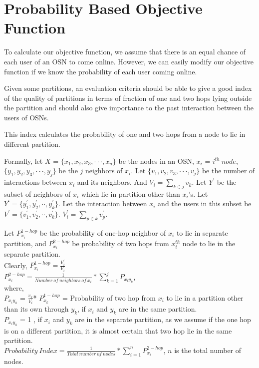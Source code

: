 \documentclass[letterpaper]{article}
\begin{document}
\section{Probability Based Objective Function}

   To calculate our objective function, we assume that there is an equal chance of each user of an 
OSN to come online. However, we can easily modify our objective function if we know the probability of each user
coming online.

 Given some partitions, an evaluation criteria should be able to give a good index of 
the quality of partitions in terms of fraction of one and two hops lying
outside the partition and should also give importance to the past interaction between the users of OSNs. 
  
This index calculates the probability of one and two hops from a node to lie in different partition. 

Formally, let $X$ = $\{x_1,x_2,x_3,\cdot\cdot\cdot,x_n\}$ be the nodes in an OSN, $x_i$ = $i^{th}\ node$, 
$\{y_1, y_2, y_3,\cdot\cdot\cdot,y_j\}$ be the $j$ neighbors of $x_i$. Let $\{v_1, v_2, v_3, \cdot\cdot\cdot,
 v_j\}$ be the number of interactions between $x_i$ and its neighbors. And $V_i = \sum_{k\in j} v_k$.
 Let $Y^\prime$ be 
the subset of neighbors of $x_i$ which lie in partition other than $x_i$'s. Let $Y^\prime = \{y_1^\prime, y_2^\prime, \cdot\cdot, y_k^\prime\}$. Let the interaction between $x_i$ and the users in this subset be  $V^\prime = \{v_1^\prime, v_2^\prime, \cdot\cdot, v_k^\prime\}$.
$V_i^\prime = \sum_{p\in k} v_p^\prime$.

        Let $P_{x_i}^{1-hop}$ be the probability of one-hop neighbor of $x_i$ to lie in separate partition, and $P_{x_i}^{2-hop}$ be probability of two hops from $x_i^{th}$ node to lie in the separate partition.\\
        Clearly, $P_{x_i}^{1-hop}= \frac{V_i^\prime}{V_i}$ \\
        $P_{x_i}^{2-hop}=\frac{1}{Number\ of\ neighbors\ of\ x_i} * \displaystyle\sum_{k=1}^j P_{x_i y_k}$, \\
        where,\\
        $P_{x_i y_k}$ = $\frac{v_k}{V_i}$* $P_{x_{k}}^{1-hop}$ =  Probability of two hop from  $x_{i}$ to lie  in a  partition other than  its own through $y_k$, if $x_i$ and $y_{k}$ are in the same partition.\\
        $P_{x_i y_k}$ =  1 , if $x_i$ and $y_k$ are in the separate partition, as we assume if the one hop is on a different partition, it is almost
certain that two hop lie in the same partition.\\
        $Probability\ Index=\frac{1}{Total\ number\ of\ nodes}*\displaystyle\sum_{i=1}^nP_{x_i}^{2-hop}$, $n$ is the total number of nodes.\\
\end{document}
